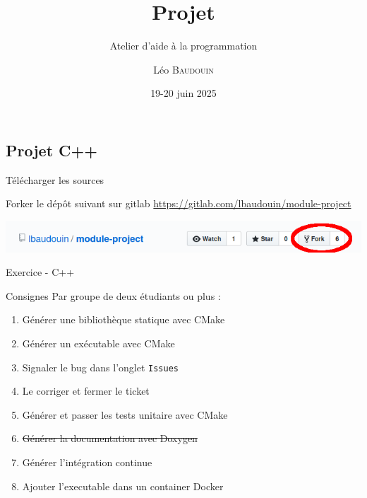 \documentclass{beamer}
\title{Projet}
\subtitle{Atelier d'aide à la programmation}
\author{L\'eo \textsc{Baudouin}}
\institute{
  {\url{baudouin.leo @ gmail.com}}
}
\date{19-20 juin 2025}
\begin{document}
\begin{frame}
  \titlepage
\end{frame}


\section{}
\subsection{Projet C++}

\begin{frame}[fragile]{Télécharger les sources}
  \begin{block}{Forker le dép\^ot suivant sur gitlab}
    \url{https://gitlab.com/lbaudouin/module-project}
  \end{block}
  
\includegraphics[width=\linewidth]{images/fork.png}  
  
\end{frame}

\begin{frame}[fragile]{Exercice - C++}  
    \begin{exampleblock}{Consignes}
	    Par groupe de deux étudiants ou plus :
    \begin{enumerate}
    \item Générer une bibliothèque statique avec CMake
    \item Générer un exécutable avec CMake
    \item Signaler le bug dans l'onglet \verb?Issues?
    \item Le corriger et fermer le ticket
    \item Générer et passer les tests unitaire avec CMake
    \item \sout{Générer la documentation avec Doxygen}
    \item Générer l'intégration continue
    \item Ajouter l'executable dans un container Docker
    \end{enumerate}
  \end{exampleblock}
\end{frame}
\end{document}
